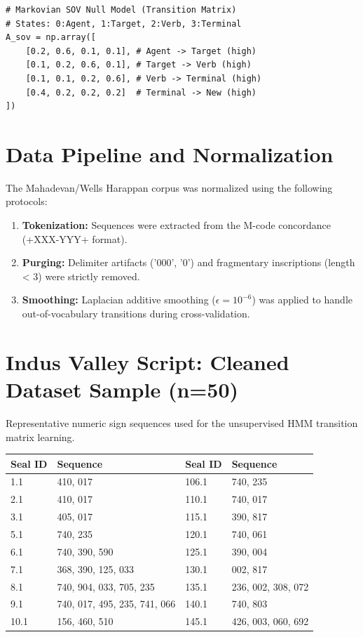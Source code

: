 \begin{verbatim}
# Markovian SOV Null Model (Transition Matrix)
# States: 0:Agent, 1:Target, 2:Verb, 3:Terminal
A_sov = np.array([
    [0.2, 0.6, 0.1, 0.1], # Agent -> Target (high)
    [0.1, 0.2, 0.6, 0.1], # Target -> Verb (high)
    [0.1, 0.1, 0.2, 0.6], # Verb -> Terminal (high)
    [0.4, 0.2, 0.2, 0.2]  # Terminal -> New (high)
])
\end{verbatim}

\section{Data Pipeline and Normalization}
The Mahadevan/Wells Harappan corpus was normalized using the following protocols:
\begin{enumerate}
    \item \textbf{Tokenization:} Sequences were extracted from the M-code concordance (+XXX-YYY+ format).
    \item \textbf{Purging:} Delimiter artifacts ('000', '0') and fragmentary inscriptions (length < 3) were strictly removed.
    \item \textbf{Smoothing:} Laplacian additive smoothing ($\epsilon = 10^{-6}$) was applied to handle out-of-vocabulary transitions during cross-validation.
\end{enumerate}

\section{Indus Valley Script: Cleaned Dataset Sample (n=50)}
Representative numeric sign sequences used for the unsupervised HMM transition matrix learning.

\begin{table}[h]
\centering
\begin{tabular}{ll|ll} \toprule
\textbf{Seal ID} & \textbf{Sequence} & \textbf{Seal ID} & \textbf{Sequence} \\ \midrule
1.1 & 410, 017 & 106.1 & 740, 235 \\
2.1 & 410, 017 & 110.1 & 740, 017 \\
3.1 & 405, 017 & 115.1 & 390, 817 \\
5.1 & 740, 235 & 120.1 & 740, 061 \\
6.1 & 740, 390, 590 & 125.1 & 390, 004 \\
7.1 & 368, 390, 125, 033 & 130.1 & 002, 817 \\
8.1 & 740, 904, 033, 705, 235 & 135.1 & 236, 002, 308, 072 \\
9.1 & 740, 017, 495, 235, 741, 066 & 140.1 & 740, 803 \\
10.1 & 156, 460, 510 & 145.1 & 426, 003, 060, 692 \\
\bottomrule
\end{tabular}
\end{table}


